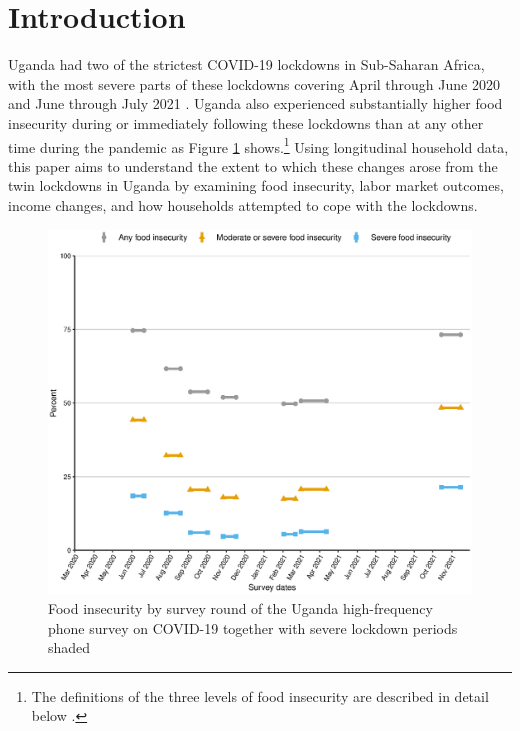 \documentclass{wber}
\begin{document}


\maketitle

\section{Introduction}\label{introduction}

Uganda had two of the strictest COVID-19 lockdowns in Sub-Saharan
Africa, with the most severe parts of these lockdowns covering April
through June 2020 and June through July 2021
\citep{BBC2020, Birner2021, Mahmud2021}. 
Uganda also experienced substantially higher food insecurity during or 
immediately following these lockdowns than at any other time during the 
pandemic as Figure \ref{fig:raw-insecurity} shows.\footnote{The
  definitions of the three levels of food insecurity are described in
  detail below \citep{FAO2015}.} Using longitudinal household data, this
paper aims to understand the extent to which these changes arose from
the twin lockdowns in Uganda by examining food insecurity, labor market
outcomes, income changes, and how households attempted to cope with the
lockdowns.

\begin{figure}
\caption{Food insecurity by survey round of the Uganda high-frequency
phone survey on COVID-19 together with severe lockdown periods
shaded}\label{fig:raw-insecurity}
\begin{center}
\includegraphics[width=\linewidth, keepaspectratio]{./eps/fig_01.eps}
\end{center}
\end{figure}
\end{document}
